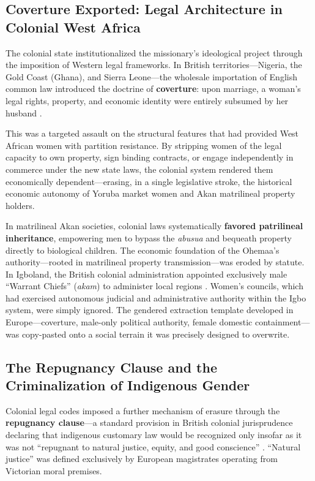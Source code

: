 \subsection{Coverture Exported: Legal Architecture in Colonial West Africa}
\label{sec:coverture_africa}

The colonial state institutionalized the missionary's ideological project through the imposition of Western legal frameworks. In British territories---Nigeria, the Gold Coast (Ghana), and Sierra Leone---the wholesale importation of English common law introduced the doctrine of \textbf{coverture}: upon marriage, a woman's legal rights, property, and economic identity were entirely subsumed by her husband \cite{colonial_gender_subsaharan, colonial_customary_law}.

This was a targeted assault on the structural features that had provided West African women with partition resistance. By stripping women of the legal capacity to own property, sign binding contracts, or engage independently in commerce under the new state laws, the colonial system rendered them economically dependent---erasing, in a single legislative stroke, the historical economic autonomy of Yoruba market women and Akan matrilineal property holders.

In matrilineal Akan societies, colonial laws systematically \textbf{favored patrilineal inheritance}, empowering men to bypass the \textit{abusua} and bequeath property directly to biological children. The economic foundation of the Ohemaa's authority---rooted in matrilineal property transmission---was eroded by statute. In Igboland, the British colonial administration appointed exclusively male ``Warrant Chiefs'' (\textit{akam}) to administer local regions \cite{colonial_nigeria_cambridge}. Women's councils, which had exercised autonomous judicial and administrative authority within the Igbo system, were simply ignored. The gendered extraction template developed in Europe---coverture, male-only political authority, female domestic containment---was copy-pasted onto a social terrain it was precisely designed to overwrite.

\subsection{The Repugnancy Clause and the Criminalization of Indigenous Gender}
\label{sec:repugnancy}

Colonial legal codes imposed a further mechanism of erasure through the \textbf{repugnancy clause}---a standard provision in British colonial jurisprudence declaring that indigenous customary law would be recognized only insofar as it was not ``repugnant to natural justice, equity, and good conscience'' \cite{colonial_customary_law, w2w_brill}. ``Natural justice'' was defined exclusively by European magistrates operating from Victorian moral premises.

